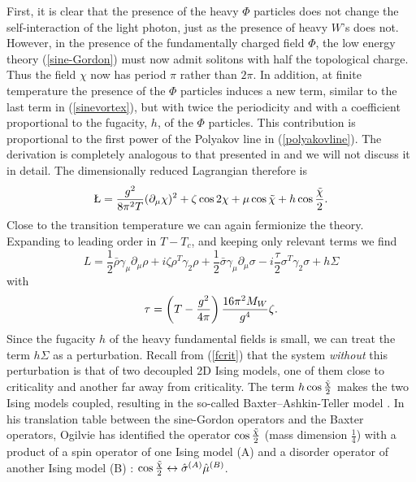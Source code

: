 \documentclass[a4paper,aps,prd,superscriptaddress,showpacs,showkeys]{revtex4}
\begin{document}
First, it is clear that the presence of the heavy $\Phi$ particles does
not
change the self-interaction of the light photon, just as
the presence of heavy $W$'s does not.
However, in the presence of the fundamentally charged field $\Phi$, the
low
energy theory (\ref{sine-Gordon}) must now admit solitons with half the
topological charge. Thus the field
$\chi$  now has period $\pi$ rather than $2\pi$.
In addition, at finite temperature the presence of the $\Phi$
particles induces  a new term, similar to the last term
in (\ref{sinevortex}), but  with twice the periodicity and with a
coefficient proportional to the fugacity, $h$, of the $\Phi$ particles.
This contribution is proportional to the first power of the
Polyakov line in (\ref{polyakovline}). The derivation is completely
analogous to that  presented in \cite{gg1} and we will not discuss it in
detail. The dimensionally reduced Lagrangian therefore is
\begin{eqnarray}
\L = { g^2 \over 8 \pi^2 T } (\partial_{\mu}\chi)^2 +
\zeta\cos 2 \chi
+ \mu \cos \tilde{\chi}   +h\cos {\tilde{\chi}\over 2}    .
\label{sinevortex1}
\end{eqnarray}
Close to the transition temperature we can again fermionize the theory.
Expanding to leading order in $T-T_c$, and keeping only relevant
terms we find
\begin{equation}
L=\frac12\bar\rho\gamma_\mu\partial_\mu\rho+
i\zeta{\rho}^T\gamma_2\rho
+\frac12\bar\sigma\gamma_\mu\partial_\mu\sigma
-i\frac{\tau}{2}{\sigma}^T\gamma_2\sigma +h\Sigma
\label{lcrit}
\end{equation}
with
\begin{eqnarray}
\tau=
\left(T-{g^2\over 4\pi}\right){16\pi^2M_W\over g^4 }\zeta .
\label{taueq}
\end{eqnarray}
Since the fugacity $h$ of the heavy fundamental fields is small, we can
treat the term $h\Sigma$
as a perturbation. Recall
from  (\ref{fcrit}) that the system {\it without} this perturbation is
that of two decoupled 2D Ising models,
one of them close to criticality and another far away from criticality.
The term $h\cos {\tilde{\chi}\over 2}$ makes the two Ising models
coupled, resulting in the so-called Baxter--Ashkin-Teller model
\cite{ogilvie}. In his translation table between the sine-Gordon operators
and the Baxter operators,
Ogilvie \cite{ogilvie} has identified the operator $\cos
{\tilde{\chi}\over 2}$
(mass dimension $\frac14$)
with a product of a spin operator of one Ising model (A) and a disorder
operator
of another Ising model (B) : $\cos
{\tilde{\chi}\over 2}\leftrightarrow\hat{\sigma}^{(A)}\hat{\mu}^{(B)}$.
\end{document}
